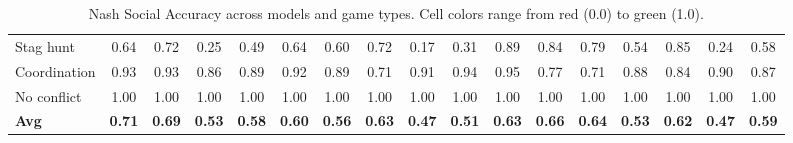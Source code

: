 \begin{table}[htbp]
\begin{adjustbox}{max width=\textwidth}
\begin{tabular}{lccccccccccccccc|c}
Stag hunt & \cellcolor[HTML]{BFE2A0}0.64 & \cellcolor[HTML]{99D18D}0.72 & \cellcolor[HTML]{EA9672}0.25 & \cellcolor[HTML]{FEFBBC}0.49 & \cellcolor[HTML]{BCE19E}0.64 & \cellcolor[HTML]{D0EAA8}0.60 & \cellcolor[HTML]{98D08D}0.72 & \cellcolor[HTML]{E4775B}0.17 & \cellcolor[HTML]{EFAF84}0.31 & \cellcolor[HTML]{4CAE68}0.89 & \cellcolor[HTML]{65B974}0.84 & \cellcolor[HTML]{7AC37E}0.79 & \cellcolor[HTML]{EEF7B7}0.54 & \cellcolor[HTML]{5DB670}0.85 & \cellcolor[HTML]{E9926F}0.24 & \cellcolor[HTML]{DAEEAD}0.58 \\
Coordination & \cellcolor[HTML]{39A65F}0.93 & \cellcolor[HTML]{38A55E}0.93 & \cellcolor[HTML]{5BB56F}0.86 & \cellcolor[HTML]{4DAE68}0.89 & \cellcolor[HTML]{3CA760}0.92 & \cellcolor[HTML]{4DAF68}0.89 & \cellcolor[HTML]{A0D491}0.71 & \cellcolor[HTML]{43AA64}0.91 & \cellcolor[HTML]{37A55E}0.94 & \cellcolor[HTML]{30A25A}0.95 & \cellcolor[HTML]{82C682}0.77 & \cellcolor[HTML]{9FD390}0.71 & \cellcolor[HTML]{50B06A}0.88 & \cellcolor[HTML]{64B974}0.84 & \cellcolor[HTML]{49AD67}0.90 & \cellcolor[HTML]{56B36D}0.87 \\
No conflict & \cellcolor[HTML]{1A9850}1.00 & \cellcolor[HTML]{1A9850}1.00 & \cellcolor[HTML]{1A9850}1.00 & \cellcolor[HTML]{1A9850}1.00 & \cellcolor[HTML]{1A9850}1.00 & \cellcolor[HTML]{1A9850}1.00 & \cellcolor[HTML]{1A9850}1.00 & \cellcolor[HTML]{1A9850}1.00 & \cellcolor[HTML]{1A9850}1.00 & \cellcolor[HTML]{1A9850}1.00 & \cellcolor[HTML]{1A9850}1.00 & \cellcolor[HTML]{1A9850}1.00 & \cellcolor[HTML]{1A9850}1.00 & \cellcolor[HTML]{1A9850}1.00 & \cellcolor[HTML]{1A9850}1.00 & \cellcolor[HTML]{1A9850}1.00 \\
\midrule
\textbf{Avg} & \cellcolor[HTML]{9FD490}\textbf{0.71} & \cellcolor[HTML]{A7D794}\textbf{0.69} & \cellcolor[HTML]{F3F9B9}\textbf{0.53} & \cellcolor[HTML]{D9EDAC}\textbf{0.58} & \cellcolor[HTML]{D0EAA8}\textbf{0.60} & \cellcolor[HTML]{E4F3B2}\textbf{0.56} & \cellcolor[HTML]{C5E5A3}\textbf{0.63} & \cellcolor[HTML]{FCF2B5}\textbf{0.47} & \cellcolor[HTML]{FCFDBD}\textbf{0.51} & \cellcolor[HTML]{C3E4A2}\textbf{0.63} & \cellcolor[HTML]{B7DE9C}\textbf{0.66} & \cellcolor[HTML]{C0E3A0}\textbf{0.64} & \cellcolor[HTML]{F3F9B9}\textbf{0.53} & \cellcolor[HTML]{C7E6A4}\textbf{0.62} & \cellcolor[HTML]{FCF1B4}\textbf{0.47} & \cellcolor[HTML]{D7EDAB}\textbf{0.59} \\
\bottomrule
\end{tabular}
\end{adjustbox}
\caption{Nash Social Accuracy across models and game types. 
Cell colors range from \textcolor[HTML]{D73027}{red} (0.0) to \textcolor[HTML]{1A9850}{green} (1.0).}
\label{tab:accuracy_heatmap}
\end{table}